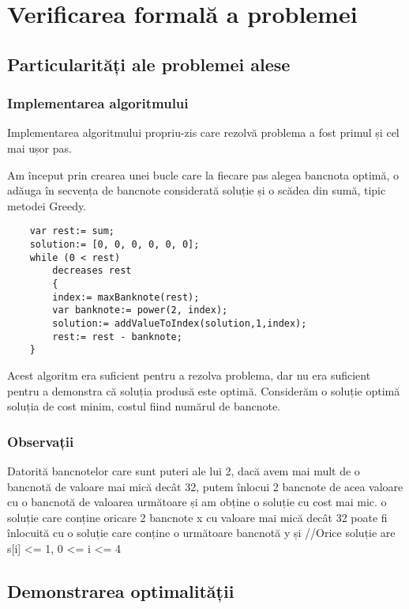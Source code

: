 
\chapter{Verificarea formală a problemei}


\section{Particularități ale problemei alese}
    \subsection{Implementarea algoritmului}
    Implementarea algoritmului propriu-zis care rezolvă problema a fost primul și cel mai ușor pas.\par
    Am început prin crearea unei bucle care la fiecare pas alegea bancnota optimă, o adăuga în secvența de 
    bancnote considerată soluție și o scădea din sumă, tipic metodei Greedy.
    \begin{lstlisting}
    var rest:= sum;
    solution:= [0, 0, 0, 0, 0, 0];
    while (0 < rest)
        decreases rest 
        {
        index:= maxBanknote(rest);
        var banknote:= power(2, index);
        solution:= addValueToIndex(solution,1,index);
        rest:= rest - banknote;
    }
    \end{lstlisting}
    Acest algoritm era suficient pentru a rezolva problema, dar nu era suficient pentru a demonstra că soluția produsă este optimă.
    Considerăm o soluție optimă soluția de cost minim, costul fiind numărul de bancnote.
    \subsection{Observații}
    Datorită bancnotelor care sunt puteri ale lui 2, dacă avem mai mult de o bancnotă de valoare mai mică decât 32,
    putem înlocui 2 bancnote de acea valoare cu o bancnotă de valoarea următoare și am obține o soluție cu cost mai mic.
    o soluție care conține oricare 2 bancnote x cu valoare mai mică 
    decât 32 poate fi înlocuită cu o soluție care conține o următoare bancnotă y   și 
    //Orice soluție are s[i] <= 1, 0 <= i <= 4




\section{Demonstrarea optimalității}
